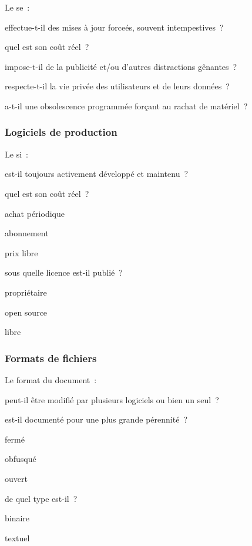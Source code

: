 Le \gls{se} :
\begin{itmz}
\item{effectue-t-il des mises à jour forceés, souvent intempestives ?}
\item{quel est son coût réel ?
    \begin{itmz}
    \item{impose-t-il de la publicité et/ou d’autres distractions gênantes ?}
    \item{respecte-t-il la vie privée des utilisateurs et de leurs données ?}
    \item{a-t-il une obsolescence programmée forçant au rachat de matériel ?}
    \end{itmz}
}
\end{itmz}

\subsubsection{Logiciels de production}

Le \gls{si} :
\begin{itmz}
\item{est-il toujours activement développé et maintenu ?}
\item{quel est son coût réel ?
    \begin{itmz}
    \item{achat périodique}
    \item{abonnement}
    \item{prix libre}
    \end{itmz}
}
\item{sous quelle licence est-il publié ?
    \begin{itmz}
    \item{propriétaire}
    \item{open source}
    \item{libre}
    \end{itmz}
}
\end{itmz}

\subsubsection{Formats de fichiers}

Le format du document :
\begin{itmz}
\item{peut-il être modifié par plusieurs logiciels ou bien un seul ?}
\item{est-il documenté pour une plus grande pérennité ?
    \begin{itmz}
    \item{fermé}
    \item{obfusqué}
    \item{ouvert}
    \end{itmz}
}
\item{de quel type est-il ?
    \begin{itmz}
    \item{binaire}
    \item{textuel}
    \end{itmz}
}
\end{itmz}

